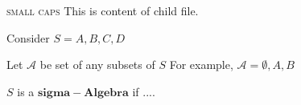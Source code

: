 

\textsc{small caps}
This is content of child file. 

Consider $S = {A,B,C,D}$

Let $\mathcal{A}$   be set of any subsets of $S$
For example, $\mathcal{A} = {\emptyset, {A,B}}$


$S$ is a $\mathbf{sigma-Algebra}$ if .... 



